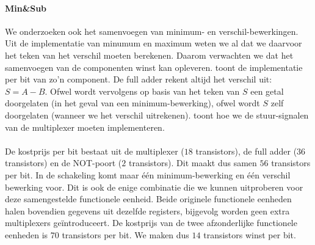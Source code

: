 \paragraph{Min\&Sub} We onderzoeken ook het samenvoegen van minimum- en verschil-bewerkingen. Uit de implementatie van minumum en maximum weten we al dat we daarvoor het teken van het verschil moeten berekenen. Daarom verwachten we dat het samenvoegen van de componenten winst kan opleveren.  toont de implementatie per bit van zo'n component.
De full adder rekent altijd het verschil uit: $S=A-B$. Ofwel wordt vervolgens op basis van het teken van $S$ een getal doorgelaten (in het geval van een minimum-bewerking), ofwel wordt $S$ zelf doorgelaten (wanneer we het verschil uitrekenen).
 toont hoe we de stuur-signalen van de multiplexer moeten implementeren.
\paragraph{}
De kostprijs per bit bestaat uit de multiplexer ($18$ transistors), de full adder ($36$ transistors) en de NOT-poort ($2$ transistors). Dit maakt dus samen $56$ transistors per bit. In de schakeling komt maar \'e\'en minimum-bewerking en \'e\'en verschil bewerking voor. Dit is ook de enige combinatie die we kunnen uitproberen voor deze samengestelde functionele eenheid. Beide originele functionele eenheden halen bovendien gegevens uit dezelfde registers, bijgevolg worden geen extra multiplexers ge\"introduceert. De kostprijs van de twee afzonderlijke functionele eenheden is $70$ transistors per bit. We maken dus $14$ transistors winst per bit.
